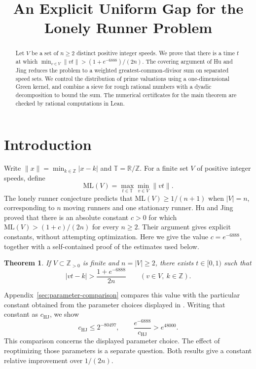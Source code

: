 \documentclass[11pt,a4paper]{article}
\title{An Explicit Uniform Gap for the Lonely Runner Problem}
\author{}
\date{}
\newtheorem{theorem}{Theorem}
\begin{document}
\maketitle
\begin{abstract}
Let \(V\) be a set of \(n\ge2\) distinct positive integer speeds.
We prove that there is a time \(t\) at which
\(\min_{v\in V}\|vt\|>(1+e^{-6888})/(2n)\).
The covering argument of Hu and Jing reduces the problem to a weighted
greatest-common-divisor sum on separated speed sets.
We control the distribution of prime valuations using a one-dimensional
Green kernel, and combine a sieve for rough rational numbers with a dyadic
decomposition to bound the sum. The numerical certificates for the main theorem are checked by rational
computations in Lean.
\end{abstract}

\section{Introduction}

Write \(\|x\|=\min_{k\in\mathbb Z}|x-k|\) and
\(\mathbb T=\mathbb R/\mathbb Z\). For a finite set \(V\) of positive
integer speeds, define
\[
 \mathrm{ML}(V)=\max_{t\in\mathbb T}\min_{v\in V}\|vt\|.
\]
The lonely runner conjecture predicts that \(\mathrm{ML}(V)\ge 1/(n+1)\)
when \(|V|=n\), corresponding to \(n\) moving runners and one stationary
runner. Hu and Jing~\cite{HuJing} proved that there is an absolute
constant \(c>0\) for which \(\mathrm{ML}(V)>(1+c)/(2n)\) for every
\(n\ge2\). Their argument gives explicit constants, without attempting
optimization. Here we give the value \(c=e^{-6888}\), together with
a self-contained proof of the estimates used below.

\begin{theorem}\label{thm:main}
If \(V\subset\mathbb Z_{>0}\) is finite and \(n=|V|\ge2\), there exists
\(t\in[0,1)\) such that
\[
 |vt-k|>\frac{1+e^{-6888}}{2n}
 \qquad(v\in V,\ k\in\mathbb Z).
\]
\end{theorem}

Appendix~\ref{sec:parameter-comparison} compares this value with the
particular constant obtained from the parameter choices displayed in
\cite[Theorem~7.2 and Section~8]{HuJing}. Writing that constant as
\(c_{\mathrm{HJ}}\), we show
\[
 c_{\mathrm{HJ}}\le 2^{-80497},\qquad
 \frac{e^{-6888}}{c_{\mathrm{HJ}}}>e^{48000}.
\]
This comparison concerns the displayed parameter choice. The effect of
reoptimizing those parameters is a separate question. Both results give a
constant relative improvement over \(1/(2n)\).
\end{document}

